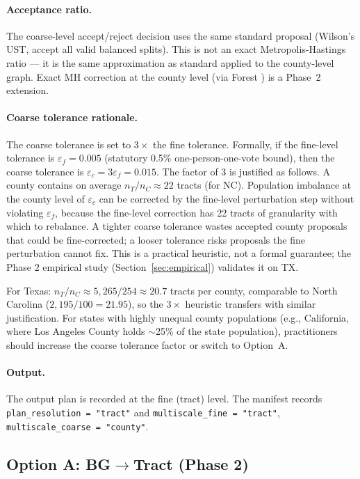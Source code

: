 \paragraph{Acceptance ratio.}
The coarse-level accept/reject decision uses the same standard \recom{} proposal
(Wilson's UST, accept all valid balanced splits).
This is not an exact Metropolis-Hastings ratio --- it is the same approximation
as standard \recom{} applied to the county-level graph.
Exact MH correction at the county level (via Forest \recom{}) is a Phase~2 extension.

\paragraph{Coarse tolerance rationale.}
The coarse tolerance is set to $3\times$ the fine tolerance.
Formally, if the fine-level tolerance is $\varepsilon_f = 0.005$
(statutory 0.5\% one-person-one-vote bound), then the coarse tolerance
is $\varepsilon_c = 3\varepsilon_f = 0.015$.
The factor of 3 is justified as follows.
A county contains on average $n_T / n_C \approx 22$ tracts (for NC).
Population imbalance at the county level of $\varepsilon_c$ can be
corrected by the fine-level perturbation step without violating
$\varepsilon_f$, because the fine-level correction has 22 tracts of
granularity with which to rebalance.
A tighter coarse tolerance wastes accepted county proposals that could
be fine-corrected; a looser tolerance risks proposals the fine
perturbation cannot fix.
This is a practical heuristic, not a formal guarantee; the Phase 2
empirical study (Section~\ref{sec:empirical}) validates it on TX.

For Texas: $n_T / n_C \approx 5{,}265 / 254 \approx 20.7$ tracts per county,
comparable to North Carolina ($2{,}195 / 100 = 21.95$), so the $3\times$
heuristic transfers with similar justification.
For states with highly unequal county populations (e.g., California, where
Los Angeles County holds $\sim$25\% of the state population), practitioners
should increase the coarse tolerance factor or switch to Option~A.

\paragraph{Output.}
The output plan is recorded at the fine (tract) level.
The manifest records \texttt{plan\_resolution = "tract"} and
\texttt{multiscale\_fine = "tract"}, \texttt{multiscale\_coarse = "county"}.

\subsection{Option A: BG$\to$Tract (Phase 2)}
\label{ssec:optiona}

